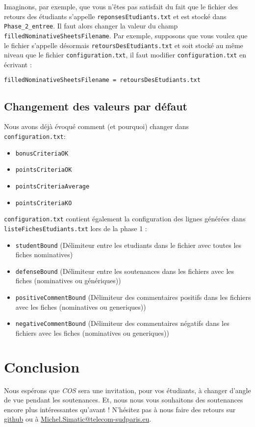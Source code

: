 \documentclass[11pt]{article}
\begin{document}
Imaginons, par exemple, que vous n'êtes pas satisfait du fait que le
fichier des retours des étudiants s'appelle \verb~reponsesEtudiants.txt~ et
est stocké dans \verb~Phase_2_entree~. Il faut alors changer la valeur du
champ \verb~filledNominativeSheetsFilename~. Par exemple, supposons que
vous voulez que le fichier s'appelle désormais
\verb~retoursDesEtudiants.txt~ et soit stocké au même niveau que le fichier
\verb~configuration.txt~, il faut modifier \verb~configuration.txt~ en
écrivant :

\verb~filledNominativeSheetsFilename = retoursDesEtudiants.txt~
\subsection{Changement des valeurs par défaut}
\label{sec-7-2}
Nous avons déjà évoqué comment (et pourquoi) changer dans
\verb~configuration.txt~:
\begin{itemize}
\item \verb~bonusCriteriaOK~
\item \verb~pointsCriteriaOK~
\item \verb~pointsCriteriaAverage~
\item \verb~pointsCriteriaKO~
\end{itemize}

\verb~configuration.txt~ contient également la configuration des lignes
générées dans \verb~listeFichesEtudiants.txt~ lors de la phase 1 :
\begin{itemize}
\item \verb~studentBound~ (Délimiteur entre les etudiants dans le fichier avec
toutes les fiches nominatives)
\item \verb~defenseBound~ (Délimiteur entre les soutenances dans les fichiers
avec les fiches (nominatives ou génériques))
\item \verb~positiveCommentBound~ (Délimiteur des commentaires positifs dans
les fichiers avec les fiches (nominatives ou generiques))
\item \verb~negativeCommentBound~ (Délimiteur des commentaires négatifs dans
les fichiers avec les fiches (nominatives ou generiques))
\end{itemize}
\section{Conclusion}
\label{sec-8}
Nous espérons que \emph{COS} sera une invitation, pour vos étudiants, à
changer d'angle de vue pendant les soutenances. Et, nous nous vous
souhaitons des soutenances encore plus intéressantes qu'avant !
N'hésitez pas à nous faire des retours sur \href{https://github.com/simatic/COS}{github} ou à
\href{mailto:Michel.Simatic@telecom-sudparis.eu}{Michel.Simatic@telecom-sudparis.eu}.
\end{document}
